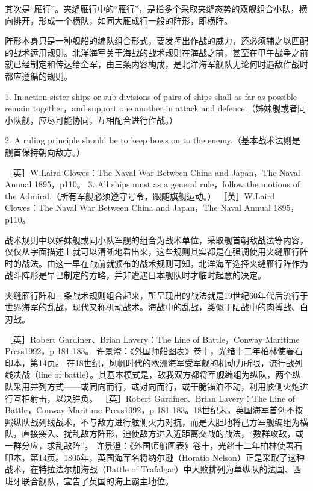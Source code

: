 \documentclass[12pt,UTF8]{ctexbook}
\begin{document}
其次是“雁行”。夹缝雁行中的“雁行”，是指多个采取夹缝态势的双舰组合小队，横向排开，形成一个横队，如同大雁成行一般的阵形，即横阵。

阵形本身只是一种舰船的编队组合形式，要发挥出作战的威力，还必须辅之以匹配的战术运用规则。北洋海军关于海战的战术规则在海战之前，甚至在甲午战争之前就已经制定和传达给全军，由三条内容构成，是北洋海军舰队无论何时遇敌作战时都应遵循的规则。

1. In action sister ships or sub-divisions of pairs of ships shall as far as possible remain together，and support one another in attack and defence.（姊妹舰或者同小队舰，应尽可能协同，互相配合进行作战。）

2. A ruling principle should be to keep bows on to the enemy.（基本战术法则是舰首保持朝向敌方。）

［英］W.Laird Clowes：The Naval War Between China and Japan，The Naval Annual 1895，p110。
3. All ships must as a general rule，follow the motions of the Admiral.（所有军舰必须遵守号令，跟随旗舰运动。） ［英］W.Laird Clowes：The Naval War Between China and Japan，The Naval Annual 1895，p110。

战术规则中以姊妹舰或同小队军舰的组合为战术单位，采取舰首朝敌战法等内容，仅仅从字面描述上就可以清晰地看出来，这些规则其实都是在强调使用夹缝雁行阵时的战法。由这一早在战前就颁布的战术规则可知，北洋海军选择夹缝雁行阵作为战斗阵形是早已制定的方略，并非遭遇日本舰队时才临时起意的决定。

夹缝雁行阵和三条战术规则组合起来，所呈现出的战法就是19世纪60年代后流行于世界海军的乱战，现代又称机动战术。海战中的乱战，类似于陆战中的肉搏战、白刃战。

［英］Robert Gardiner、Brian Lavery：The Line of Battle，Conway Maritime Press1992，p 181-183。
许景澄：《外国师船图表》卷十，光绪十二年柏林使署石印本，第14页。
在18世纪，风帆时代的欧洲海军受军舰的机动力所限，流行战列线决战（line of battle）。其基本模式是，敌我双方都将军舰编组为纵队，两个纵队采用并列方式——或同向而行，或对向而行，或干脆锚泊不动，利用舷侧火炮进行互相射击，以决胜负。 ［英］Robert Gardiner、Brian Lavery：The Line of Battle，Conway Maritime Press1992，p 181-183。18世纪末，英国海军首创不按照纵队战列线战术，不与敌方进行舷侧火力对抗，而是大胆地将己方军舰编组为横队，直接突入、扰乱敌方阵形，迫使敌方进入近距离交战的战法，“数群攻敌，或一群分应，求乱敌阵”。 许景澄：《外国师船图表》卷十，光绪十二年柏林使署石印本，第14页。1805年，英国海军名将纳尔逊（Horatio Nelson）正是采取了这种战术，在特拉法尔加海战（Battle of Trafalgar）中大败排列为单纵队的法国、西班牙联合舰队，宣告了英国的海上霸主地位。
\end{document}
